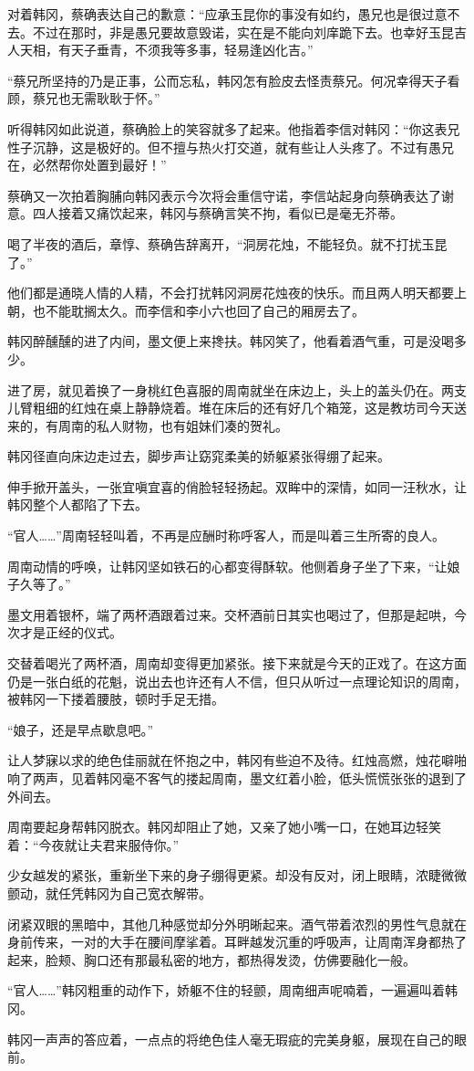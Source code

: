 对着韩冈，蔡确表达自己的歉意：“应承玉昆你的事没有如约，愚兄也是很过意不去。不过在那时，非是愚兄要故意毁诺，实在是不能向刘庠跪下去。也幸好玉昆吉人天相，有天子垂青，不须我等多事，轻易逢凶化吉。”

“蔡兄所坚持的乃是正事，公而忘私，韩冈怎有脸皮去怪责蔡兄。何况幸得天子看顾，蔡兄也无需耿耿于怀。”

听得韩冈如此说道，蔡确脸上的笑容就多了起来。他指着李信对韩冈：“你这表兄性子沉静，这是极好的。但不擅与热火打交道，就有些让人头疼了。不过有愚兄在，必然帮你处置到最好！”

蔡确又一次拍着胸脯向韩冈表示今次将会重信守诺，李信站起身向蔡确表达了谢意。四人接着又痛饮起来，韩冈与蔡确言笑不拘，看似已是毫无芥蒂。

喝了半夜的酒后，章惇、蔡确告辞离开，“洞房花烛，不能轻负。就不打扰玉昆了。”

他们都是通晓人情的人精，不会打扰韩冈洞房花烛夜的快乐。而且两人明天都要上朝，也不能耽搁太久。而李信和李小六也回了自己的厢房去了。

韩冈醉醺醺的进了内间，墨文便上来搀扶。韩冈笑了，他看着酒气重，可是没喝多少。

进了房，就见着换了一身桃红色喜服的周南就坐在床边上，头上的盖头仍在。两支儿臂粗细的红烛在桌上静静烧着。堆在床后的还有好几个箱笼，这是教坊司今天送来的，有周南的私人财物，也有姐妹们凑的贺礼。

韩冈径直向床边走过去，脚步声让窈窕柔美的娇躯紧张得绷了起来。

伸手掀开盖头，一张宜嗔宜喜的俏脸轻轻扬起。双眸中的深情，如同一汪秋水，让韩冈整个人都陷了下去。

“官人……”周南轻轻叫着，不再是应酬时称呼客人，而是叫着三生所寄的良人。

周南动情的呼唤，让韩冈坚如铁石的心都变得酥软。他侧着身子坐了下来，“让娘子久等了。”

墨文用着银杯，端了两杯酒跟着过来。交杯酒前日其实也喝过了，但那是起哄，今次才是正经的仪式。

交替着喝光了两杯酒，周南却变得更加紧张。接下来就是今天的正戏了。在这方面仍是一张白纸的花魁，说出去也许还有人不信，但只从听过一点理论知识的周南，被韩冈一下搂着腰肢，顿时手足无措。

“娘子，还是早点歇息吧。”

让人梦寐以求的绝色佳丽就在怀抱之中，韩冈有些迫不及待。红烛高燃，烛花噼啪响了两声，见着韩冈毫不客气的搂起周南，墨文红着小脸，低头慌慌张张的退到了外间去。

周南要起身帮韩冈脱衣。韩冈却阻止了她，又亲了她小嘴一口，在她耳边轻笑着：“今夜就让夫君来服侍你。”

少女越发的紧张，重新坐下来的身子绷得更紧。却没有反对，闭上眼睛，浓睫微微颤动，就任凭韩冈为自己宽衣解带。

闭紧双眼的黑暗中，其他几种感觉却分外明晰起来。酒气带着浓烈的男性气息就在身前传来，一对的大手在腰间摩挲着。耳畔越发沉重的呼吸声，让周南浑身都热了起来，脸颊、胸口还有那最私密的地方，都热得发烫，仿佛要融化一般。

“官人……”韩冈粗重的动作下，娇躯不住的轻颤，周南细声呢喃着，一遍遍叫着韩冈。

韩冈一声声的答应着，一点点的将绝色佳人毫无瑕疵的完美身躯，展现在自己的眼前。

